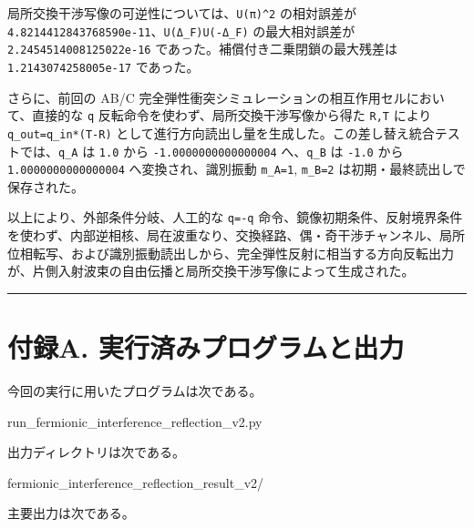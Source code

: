 \documentclass[
  a4paper,
]{article}
\newenvironment{Shaded}{}{}
\newcommand{\NormalTok}[1]{#1}
\begin{document}
局所交換干渉写像の可逆性については、\texttt{U(π)\^{}2} の相対誤差が
\texttt{4.8214412843768590e-11}、\texttt{U(Δ\_F)U(-Δ\_F)}
の最大相対誤差が \texttt{2.2454514008125022e-16}
であった。補償付き二乗閉鎖の最大残差は \texttt{1.2143074258005e-17}
であった。

さらに、前回の AB/C
完全弾性衝突シミュレーションの相互作用セルにおいて、直接的な \texttt{q}
反転命令を使わず、局所交換干渉写像から得た \texttt{R,T} により
\texttt{q\_out=q\_in*(T-R)}
として進行方向読出し量を生成した。この差し替え統合テストでは、\texttt{q\_A}
は \texttt{1.0} から \texttt{-1.0000000000000004} へ、\texttt{q\_B} は
\texttt{-1.0} から \texttt{1.0000000000000004} へ変換され、識別振動
\texttt{m\_A=1}, \texttt{m\_B=2} は初期・最終読出しで保存された。

以上により、外部条件分岐、人工的な \texttt{q=-q}
命令、鏡像初期条件、反射境界条件を使わず、内部逆相核、局在波重なり、交換経路、偶・奇干渉チャンネル、局所位相転写、および識別振動読出しから、完全弾性反射に相当する方向反転出力が、片側入射波束の自由伝播と局所交換干渉写像によって生成された。

\begin{center}\rule{0.5\linewidth}{0.5pt}\end{center}

\section{付録A.
実行済みプログラムと出力}\label{ux4ed8ux9332a.-ux5b9fux884cux6e08ux307fux30d7ux30edux30b0ux30e9ux30e0ux3068ux51faux529b}

今回の実行に用いたプログラムは次である。

\begin{Shaded}
\begin{Highlighting}[]
\NormalTok{run\_fermionic\_interference\_reflection\_v2.py}
\end{Highlighting}
\end{Shaded}

出力ディレクトリは次である。

\begin{Shaded}
\begin{Highlighting}[]
\NormalTok{fermionic\_interference\_reflection\_result\_v2/}
\end{Highlighting}
\end{Shaded}

主要出力は次である。
\end{document}
